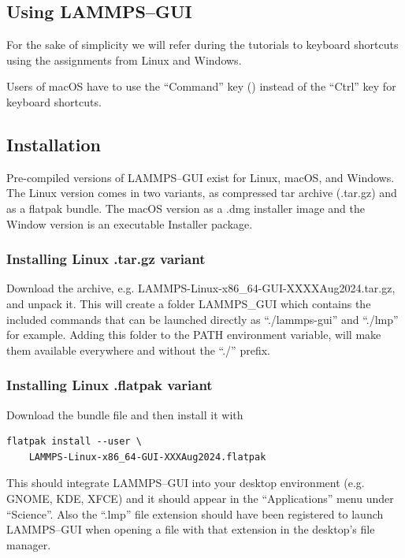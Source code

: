 \documentclass[9pt,tutorial]{livecoms}
\begin{document}
\begin{appendices}
\section{Using LAMMPS--GUI}
\label{using-lammps-gui-label}

\begin{note}
  For the sake of simplicity we will refer during the tutorials to
  keyboard shortcuts using the assignments from Linux and Windows.

  Users of macOS have to use the ``Command'' key (\cmd) instead of the
  ``Ctrl'' key for keyboard shortcuts.
\end{note}

\subsection{Installation}

Pre-compiled versions of LAMMPS--GUI exist for Linux, {macOS}, and Windows.
The Linux version comes in two variants, as compressed tar archive (.tar.gz)
and as a flatpak \cite{flatpak_home} bundle. The macOS version as a .dmg
installer image and the Window version is an executable Installer package.

\subsubsection{Installing Linux .tar.gz variant}

Download the archive, e.g. LAMMPS-Linux-x86\_64-GUI-XXXXAug2024.tar.gz, and unpack it.
This will create a folder LAMMPS\_GUI which contains the included commands that
can be launched directly as ``./lammps-gui'' and ``./lmp'' for example.  Adding this
folder to the PATH environment variable, will make them available everywhere and without
the ``./'' prefix.

\subsubsection{Installing Linux .flatpak variant}

Download the bundle file and then install it with
{
\normalsize
\begin{verbatim}
flatpak install --user \
    LAMMPS-Linux-x86_64-GUI-XXXAug2024.flatpak
\end{verbatim}
}
This should integrate LAMMPS--GUI into your desktop environment (e.g. GNOME,
KDE, XFCE) and it should appear in the ``Applications'' menu under ``Science''.
Also the ``.lmp'' file extension should have been registered to launch LAMMPS--GUI
when opening a file with that extension in the desktop's file manager.


\end{appendices}
\end{document}

